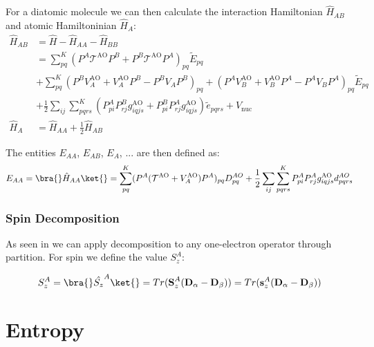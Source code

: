   For a diatomic molecule we can then calculate the interaction Hamiltonian $\hat{H}_{AB}$ and atomic Hamiltoninian $\hat{H}_{A}$:
  \begin{align}
    \hat{H}_{AB} &= \hat{H} -   \hat{H}_{AA} -  \hat{H}_{BB} \\
     &= \sum_{pq}^K (P^A \mathcal{T}^{\text{AO}} P^B + P^B \mathcal{T}^{\text{AO}} P^A)_{pq} \widetilde{E}_{pq} \\
     &+\sum_{pq}^K (P^B V_{A}^{\text{AO}} + V_{A}^{\text{AO}} P^B - P^B V_A P^B)_{pq} + (P^A V_{B}^{\text{AO}} + V_{B}^{\text{AO}} P^A - P^A V_B P^A)_{pq} \widetilde{E}_{pq} \\
     &+ \frac{1}{2} \sum_{ij} \sum_{pqrs}^K (P^{A}_{pi} P^{B}_{rj} g^{\text{AO}}_{iqjs} +  P^{B}_{pi} P^{A}_{rj} g^{\text{AO}}_{iqjs}) \widetilde{e}_{pqrs} + V_{\text{nuc}}  \\
    \hat{H}_A &= \hat{H}_{AA} + \frac{1}{2}   \hat{H}_{AB}
  \end{align}

  The entities $E_{AA}$, $E_{AB}$, $E_{A}$, ... are then defined as:
  \begin{equation}
    E_{AA} = \bra{} \hat{H}_{AA} \ket{} = \sum_{pq}^K (P^A (\mathcal{T}^{\text{AO}} + V_{A}^{\text{AO}}) P^A)_{pq} D^{AO}_{pq} +  \frac{1}{2} \sum_{ij} \sum_{pqrs}^K P^{A}_{pi} P^{A}_{rj} g^{\text{AO}}_{iqjs}  d^{AO}_{pqrs}
  \end{equation}
  


\subsubsection{Spin Decomposition}

As seen in \cite{mayer2005atomic} we can apply decomposition to any one-electron operator through partition. 
For spin we define the value $S_z^A$:

\begin{equation}
  S_z^A =  \bra{} \hat{S_z}^A \ket{} = Tr(\textbf{S}^A_z (\textbf{D}_\alpha - \textbf{D}_\beta)) = Tr(\textbf{s}^A_z (\textbf{D}_\alpha - \textbf{D}_\beta))
\end{equation}


\section{Entropy}
